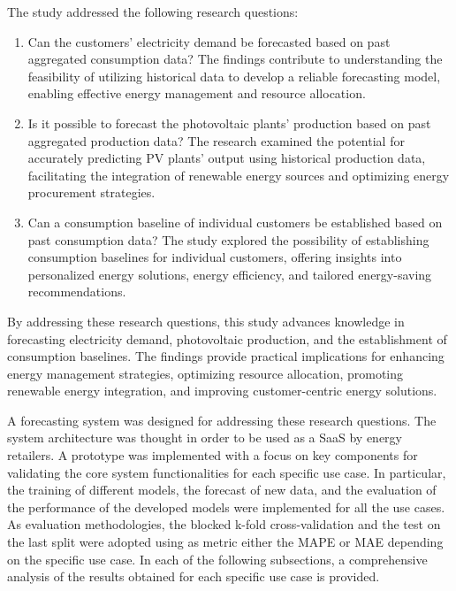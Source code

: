 The study addressed the following research questions:
\begin{enumerate}
  \item Can the customers' electricity demand be forecasted based on past aggregated consumption data? The findings contribute to understanding the feasibility of utilizing historical data to develop a reliable forecasting model, enabling effective energy management and resource allocation.
  \item Is it possible to forecast the photovoltaic plants' production based on past aggregated production data? The research examined the potential for accurately predicting PV plants' output using historical production data, facilitating the integration of renewable energy sources and optimizing energy procurement strategies.
  \item Can a consumption baseline of individual customers be established based on past consumption data? The study explored the possibility of establishing consumption baselines for individual customers, offering insights into personalized energy solutions, energy efficiency, and tailored energy-saving recommendations.
\end{enumerate}
By addressing these research questions, this study advances knowledge in forecasting electricity demand, photovoltaic production, and the establishment of consumption baselines. The findings provide practical implications for enhancing energy management strategies, optimizing resource allocation, promoting renewable energy integration, and improving customer-centric energy solutions.


A forecasting system was designed for addressing these research questions.
The system architecture was thought in order to be used as a SaaS by energy retailers.
A prototype was implemented with a focus on key components for validating the core system functionalities for each specific use case.
In particular, the training of different models, the forecast of new data, and the evaluation of the performance of the developed models were implemented for all the use cases.
As evaluation methodologies, the blocked k-fold cross-validation and the test on the last split were adopted using as metric either the MAPE or MAE depending on the specific use case.
In each of the following subsections, a comprehensive analysis of the results obtained for each specific use case is provided.

